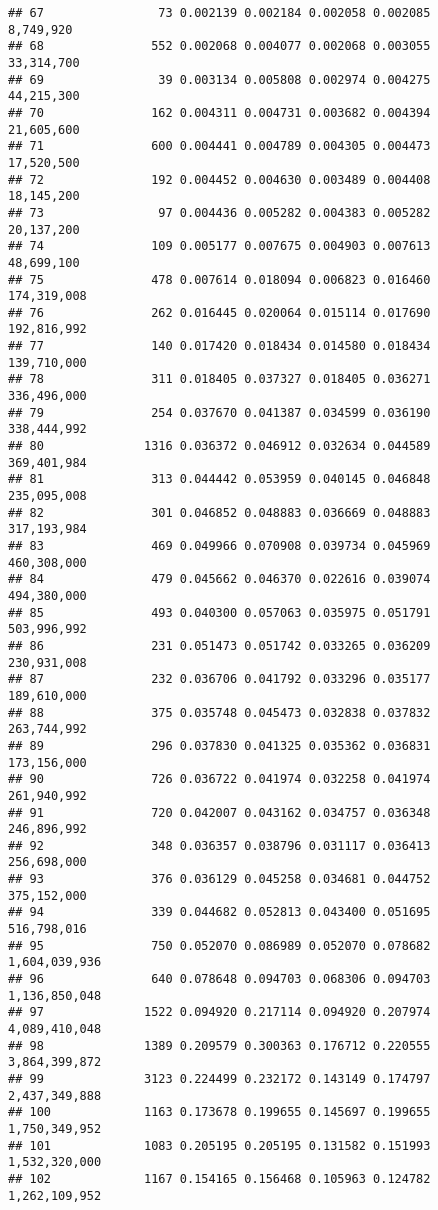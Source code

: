 \documentclass[]{article}
\begin{document}
\begin{verbatim}
## 67                73 0.002139 0.002184 0.002058 0.002085     8,749,920
## 68               552 0.002068 0.004077 0.002068 0.003055    33,314,700
## 69                39 0.003134 0.005808 0.002974 0.004275    44,215,300
## 70               162 0.004311 0.004731 0.003682 0.004394    21,605,600
## 71               600 0.004441 0.004789 0.004305 0.004473    17,520,500
## 72               192 0.004452 0.004630 0.003489 0.004408    18,145,200
## 73                97 0.004436 0.005282 0.004383 0.005282    20,137,200
## 74               109 0.005177 0.007675 0.004903 0.007613    48,699,100
## 75               478 0.007614 0.018094 0.006823 0.016460   174,319,008
## 76               262 0.016445 0.020064 0.015114 0.017690   192,816,992
## 77               140 0.017420 0.018434 0.014580 0.018434   139,710,000
## 78               311 0.018405 0.037327 0.018405 0.036271   336,496,000
## 79               254 0.037670 0.041387 0.034599 0.036190   338,444,992
## 80              1316 0.036372 0.046912 0.032634 0.044589   369,401,984
## 81               313 0.044442 0.053959 0.040145 0.046848   235,095,008
## 82               301 0.046852 0.048883 0.036669 0.048883   317,193,984
## 83               469 0.049966 0.070908 0.039734 0.045969   460,308,000
## 84               479 0.045662 0.046370 0.022616 0.039074   494,380,000
## 85               493 0.040300 0.057063 0.035975 0.051791   503,996,992
## 86               231 0.051473 0.051742 0.033265 0.036209   230,931,008
## 87               232 0.036706 0.041792 0.033296 0.035177   189,610,000
## 88               375 0.035748 0.045473 0.032838 0.037832   263,744,992
## 89               296 0.037830 0.041325 0.035362 0.036831   173,156,000
## 90               726 0.036722 0.041974 0.032258 0.041974   261,940,992
## 91               720 0.042007 0.043162 0.034757 0.036348   246,896,992
## 92               348 0.036357 0.038796 0.031117 0.036413   256,698,000
## 93               376 0.036129 0.045258 0.034681 0.044752   375,152,000
## 94               339 0.044682 0.052813 0.043400 0.051695   516,798,016
## 95               750 0.052070 0.086989 0.052070 0.078682 1,604,039,936
## 96               640 0.078648 0.094703 0.068306 0.094703 1,136,850,048
## 97              1522 0.094920 0.217114 0.094920 0.207974 4,089,410,048
## 98              1389 0.209579 0.300363 0.176712 0.220555 3,864,399,872
## 99              3123 0.224499 0.232172 0.143149 0.174797 2,437,349,888
## 100             1163 0.173678 0.199655 0.145697 0.199655 1,750,349,952
## 101             1083 0.205195 0.205195 0.131582 0.151993 1,532,320,000
## 102             1167 0.154165 0.156468 0.105963 0.124782 1,262,109,952

\end{verbatim}
\end{document}
